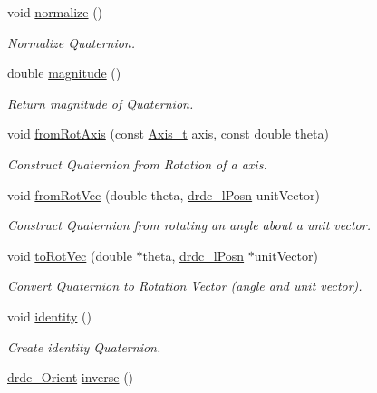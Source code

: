 \begin{CompactItemize}
void \hyperlink{classdrdc__Orient_e40486f5bc35f27bf563d804809b2c59}{normalize} ()
\begin{CompactList}\small\item\em Normalize Quaternion. \item\end{CompactList}\item 
double \hyperlink{classdrdc__Orient_c98cece704beda15a8863dc7b3b4a399}{magnitude} ()
\begin{CompactList}\small\item\em Return magnitude of Quaternion. \item\end{CompactList}\item 
void \hyperlink{classdrdc__Orient_5589a587543a4136a6dc7414970ae9f7}{fromRotAxis} (const \hyperlink{libdrdc_8h_32b2eaf8bafc891ec8018cbe48d39243}{Axis\_\-t} axis, const double theta)
\begin{CompactList}\small\item\em Construct Quaternion from Rotation of a axis. \item\end{CompactList}\item 
void \hyperlink{classdrdc__Orient_4850f51a9a34c81ffbe72b60cfeb4359}{fromRotVec} (double theta, \hyperlink{classdrdc__lPosn}{drdc\_\-lPosn} unitVector)
\begin{CompactList}\small\item\em Construct Quaternion from rotating an angle about a unit vector. \item\end{CompactList}\item 
void \hyperlink{classdrdc__Orient_035e8decc314d880060461ddd413775d}{toRotVec} (double $\ast$theta, \hyperlink{classdrdc__lPosn}{drdc\_\-lPosn} $\ast$unitVector)
\begin{CompactList}\small\item\em Convert Quaternion to Rotation Vector (angle and unit vector). \item\end{CompactList}\item 
void \hyperlink{classdrdc__Orient_0464af38b73dee1656d6fe3e080e76d7}{identity} ()
\begin{CompactList}\small\item\em Create identity Quaternion. \item\end{CompactList}\item 
\hyperlink{classdrdc__Orient}{drdc\_\-Orient} \hyperlink{classdrdc__Orient_de09f9c9a7a6773fa7e33c1f8816f6c0}{inverse} ()

\end{CompactItemize}
